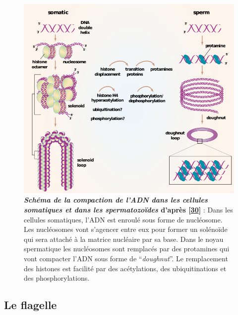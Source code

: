 \documentclass[12pt,a4paper,twoside]{ugathesis}
\theoremstyle{definition}
\theoremstyle{definition}
\theoremstyle{definition}
\theoremstyle{remark}
\begin{document}
\newpage

\begin{figure}

{\centering \includegraphics[scale=.55]{figure/noyau} 

}

\caption[Schéma de la compaction de l’ADN dans les cellules somatiques et dans les spermatozoïdes]{\textbf{\emph{Schéma de la compaction de l'ADN dans les
cellules somatiques et dans les spermatozoïdes} d'après
{[}\protect\hyperlink{ref-Braun2001}{30}{]}} : Dans les cellules
somatiques, l'ADN est enroulé sous forme de nucléosome. Les nucléosomes
vont s'agencer entre eux pour former un solénoïde qui sera attaché à la
matrice nucléaire par sa base. Dans le noyau spermatique les nucléosomes
sont remplacés par des protamines qui vont compacter l'ADN sous forme de
``\emph{doughnut}''. Le remplacement des histones est facilité par des
acétylations, des ubiquitinations et des phosphorylations.}\label{fig:noyau}
\end{figure}











\newpage

\subsection{Le flagelle}\label{le-flagelle}
\end{document}
